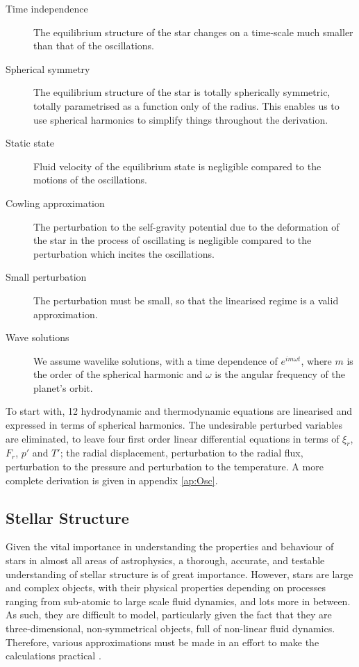 \documentclass[11pt]{amsart}
\begin{document}
\begin{description}
\item[Time independence]
 The equilibrium structure of the star changes on a time-scale much smaller than that of the oscillations.
 
 \item[Spherical symmetry]
 The equilibrium structure of the star is totally spherically symmetric, totally parametrised as a function only of the radius.  This enables us to use spherical harmonics to simplify things throughout the derivation.
 
 \item[Static state]
 Fluid velocity of the equilibrium state is negligible compared to the motions of the oscillations.
 
 \item[Cowling approximation]
 The perturbation to the self-gravity potential due to the deformation of the star in the process of oscillating is negligible compared to the perturbation which incites the oscillations.
 
 \item[Small perturbation]
 The perturbation must be small, so that the linearised regime is a valid approximation.
 
 \item[Wave solutions]
 We assume wavelike solutions, with a time dependence of $e^{i m \omega t}$, where $m$ is the order of the spherical harmonic and $\omega$ is the angular frequency of the planet's orbit.
\end{description}


To start with, 12 hydrodynamic and thermodynamic equations are linearised and expressed in terms of spherical harmonics. The undesirable perturbed variables are eliminated, to leave four first order linear differential equations in terms of $\xi_{r}$, $F_{r}$, $p'$ and $T'$; the radial displacement, perturbation to the radial flux, perturbation to the pressure and perturbation to the temperature.  A more complete derivation is given in appendix \ref{ap:Osc}.





\subsection{Stellar Structure}

Given the vital importance in understanding the properties and behaviour of stars in almost all areas of astrophysics, a thorough, accurate, and testable understanding of stellar structure is of great importance.  However, stars are large and complex objects, with their physical properties depending on processes ranging from sub-atomic to large scale fluid dynamics, and lots more in between.  As such, they are difficult to model, particularly given the fact that they are three-dimensional, non-symmetrical objects, full of non-linear fluid dynamics.  Therefore, various approximations must be made in an effort to make the calculations practical \cite{Paxton2011}.
\end{document}
